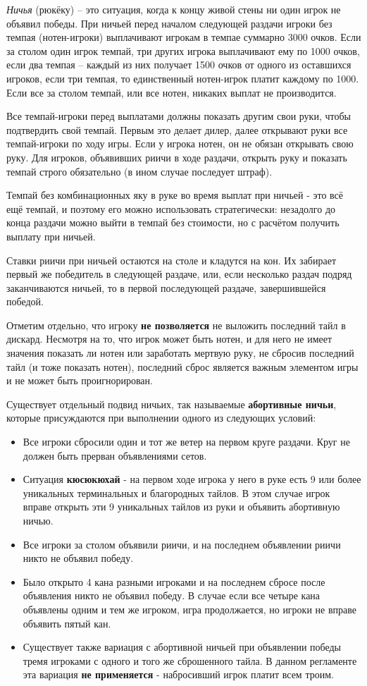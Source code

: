 \textit{Ничья} (рюкёку) – это ситуация, когда к концу живой стены ни один игрок не объявил победы. При ничьей перед началом следующей раздачи игроки без темпая (нотен-игроки) выплачивают игрокам в темпае суммарно 3000 очков. Если за столом один игрок темпай, три других игрока выплачивают ему по 1000 очков, если два темпая – каждый из них получает 1500 очков от одного из оставшихся игроков, если три темпая, то единственный нотен-игрок платит каждому по 1000. Если все за столом темпай, или все нотен, никаких выплат не производится.

Все темпай-игроки перед выплатами должны показать другим свои руки, чтобы подтвердить свой темпай. Первым это делает дилер, далее открывают руки все темпай-игроки по ходу игры. Если у игрока нотен, он не обязан открывать свою руку. Для игроков, объявивших риичи в ходе раздачи, открыть руку и показать темпай строго обязательно (в ином случае последует штраф).

Темпай без комбинационных яку в руке во время выплат при ничьей - это всё ещё темпай, и поэтому его можно использовать стратегически: незадолго до конца раздачи можно выйти в темпай без стоимости, но с расчётом получить выплату при ничьей. 

Ставки риичи при ничьей остаются на столе и кладутся на кон. Их забирает первый же победитель в следующей раздаче, или, если несколько раздач подряд заканчиваются ничьей, то в первой последующей раздаче, завершившейся победой. 

Отметим отдельно, что игроку \textbf{не позволяется} не выложить последний тайл в дискард. Несмотря на то, что игрок может быть нотен, и для него не имеет значения показать ли нотен или заработать мертвую руку, не сбросив последний тайл (и тоже показать нотен), последний сброс является важным элементом игры и не может быть проигнорирован.

Существует отдельный подвид ничьих, так называемые \textbf{абортивные ничьи}, которые присуждаются при выполнении одного из следующих условий:
\begin{itemize}
	\item Все игроки сбросили один и тот же ветер на первом круге раздачи. Круг не должен быть прерван объявлениями сетов.
	\item Ситуация \textbf{кюсюкюхай} - на первом ходе игрока у него в руке есть 9 или более уникальных терминальных и благородных тайлов. В этом случае игрок вправе открыть эти 9 уникальных тайлов из руки и объявить абортивную ничью.
	\item Все игроки за столом объявили риичи, и на последнем объявлении риичи никто не объявил победу.
	\item Было открыто 4 кана разными игроками и на последнем сбросе после объявления никто не объявил победу. В случае если все четыре кана объявлены одним и тем же игроком, игра продолжается, но игроки не вправе объявить пятый кан. 
	\item Существует также вариация с абортивной ничьей при объявлении победы тремя игроками с одного и того же сброшенного тайла. В данном регламенте эта вариация \textbf{не применяется} - набросивший игрок платит всем троим.
\end{itemize}

